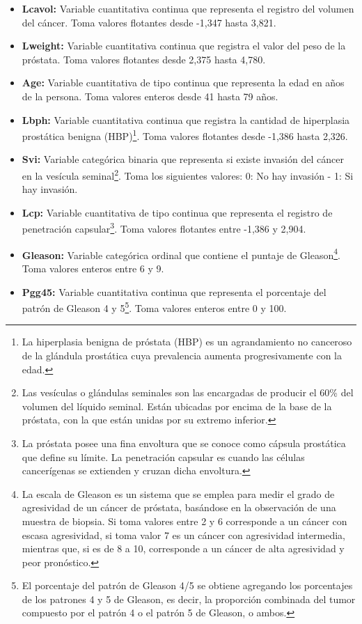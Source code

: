 \documentclass[letter, 10pt]{article}
\begin{document}
\begin{itemize}
\item \textbf{Lcavol: }Variable cuantitativa continua que representa el registro del volumen del cáncer. Toma valores flotantes desde -1,347 hasta 3,821.
\item \textbf{Lweight: }Variable cuantitativa continua que registra el valor del peso de la próstata. Toma valores flotantes desde 2,375 hasta 4,780. 
\item \textbf{Age: }Variable cuantitativa de tipo continua que representa la edad en años de la persona. Toma valores enteros desde 41 hasta 79 años.
\item \textbf{Lbph: }Variable cuantitativa continua que registra la cantidad de hiperplasia prostática benigna (HBP)\footnote{La hiperplasia benigna de próstata (HBP) es un agrandamiento no canceroso de la glándula prostática cuya prevalencia aumenta progresivamente con la edad.}. Toma valores flotantes desde -1,386 hasta 2,326. 
\item \textbf{Svi: }Variable categórica binaria que representa si existe invasión del cáncer en la vesícula seminal\footnote{Las vesículas o glándulas seminales son las encargadas de producir el 60\% del volumen del líquido seminal. Están ubicadas por encima de la base de la próstata, con la que están unidas por su extremo inferior.}. Toma los siguientes valores: 0: No hay invasión - 1: Si hay invasión. 
\item \textbf{Lcp: }Variable cuantitativa de tipo continua que representa el registro de penetración capsular\footnote{La próstata posee una fina envoltura que se conoce como cápsula prostática que define su límite. La penetración capsular es cuando las células cancerígenas se extienden y cruzan dicha envoltura.}. Toma valores flotantes entre -1,386 y 2,904. 
\item \textbf{Gleason: }Variable categórica ordinal que contiene el puntaje de Gleason\footnote{La escala de Gleason es un sistema que se emplea para medir el grado de agresividad de un cáncer de próstata, basándose en la observación de una muestra de biopsia. Si toma valores entre 2 y 6 corresponde a un cáncer con escasa agresividad, si toma valor 7 es un cáncer con agresividad intermedia, mientras que, si es de 8 a 10, corresponde a un cáncer de alta agresividad y peor pronóstico.}. Toma valores enteros entre 6 y 9.
\item \textbf{Pgg45: }Variable cuantitativa continua que representa el porcentaje del patrón de Gleason 4 y 5\footnote{El porcentaje del patrón de Gleason 4/5 se obtiene agregando los porcentajes de los patrones 4 y 5 de Gleason, es decir, la proporción combinada del tumor compuesto por el patrón 4 o el patrón 5 de Gleason, o ambos.}. Toma valores enteros entre 0 y 100.

\end{itemize}
\end{document}
